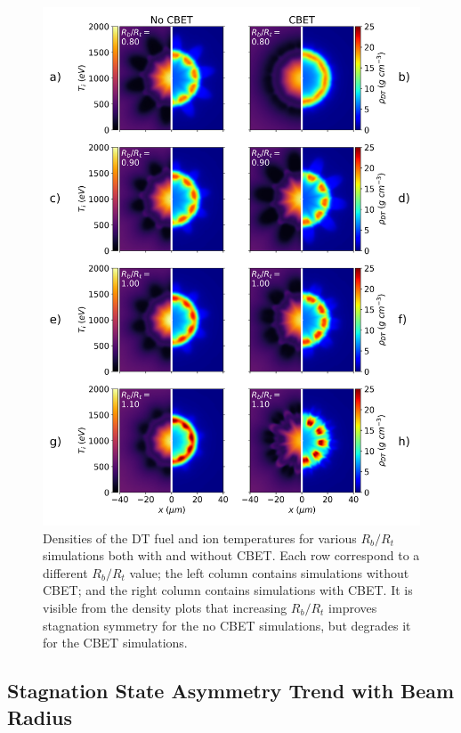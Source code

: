 \begin{figure}[t!]
    \includegraphics[width=0.9\linewidth]{Results1/Images/Stagnation_plots.png}
    \centering
    \caption{Densities of the DT fuel and ion temperatures for various $R_b/R_t$ simulations both with and without \ac{CBET}.
    Each row correspond to a different $R_b/R_t$ value; the left column contains simulations without \ac{CBET}; and the right column contains simulations with \ac{CBET}.
    It is visible from the density plots that increasing $R_b/R_t$ improves stagnation symmetry for the no \ac{CBET} simulations, but degrades it for the \ac{CBET} simulations.}%
    \label{fig:Res1_stagnation_plots}
\end{figure}



\subsection{Stagnation State Asymmetry Trend with Beam Radius}%
\label{sec:Res1_stagnation_asymm_trend}

